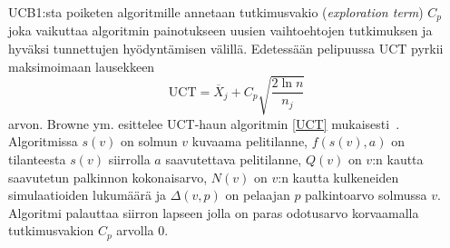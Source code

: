 \documentclass[12pt,finnish]{tktltiki2}
\theoremstyle{definition}
\theoremstyle{remark}
\begin{document}
UCB1:sta poiketen algoritmille annetaan tutkimusvakio (\textit{exploration term}) $C_p$ joka vaikuttaa algoritmin painotukseen uusien vaihtoehtojen tutkimuksen ja hyväksi tunnettujen hyödyntämisen välillä. Edetessään pelipuussa UCT pyrkii maksimoimaan lausekkeen
\begin{equation}
\text{UCT} = \overline{X}_j + C_p \sqrt{\frac{2 \ln n}{n_j}}
\end{equation}
arvon. Browne ym. esittelee UCT-haun algoritmin \ref{UCT} mukaisesti~\cite{browne}. Algoritmissa $s(v)$ on solmun $v$ kuvaama pelitilanne, $f(s(v), a)$ on tilanteesta $s(v)$ siirrolla $a$ saavutettava pelitilanne, $Q(v)$ on $v$:n kautta saavutetun palkinnon kokonaisarvo, $N(v)$ on $v$:n kautta kulkeneiden simulaatioiden lukumäärä ja $\Delta(v, p)$ on pelaajan $p$ palkintoarvo solmussa $v$. Algoritmi palauttaa siirron lapseen jolla on paras odotusarvo korvaamalla tutkimusvakion $C_p$ arvolla $0$.

\newpage
\end{document}
